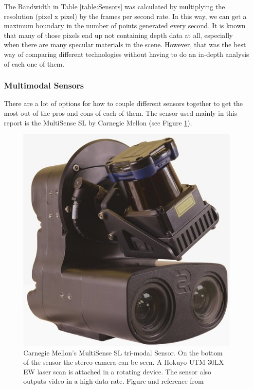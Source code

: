 \documentclass[11pt]{article}
\begin{document}
The Bandwidth in Table \ref{table:Sensors} was calculated by multiplying the resolution (pixel x pixel) by the frames per second rate. In this way, we can get a maximum boundary in the number of points generated every second. It is known that many of those pixels end up not containing depth data at all, especially when there are many specular materials in the scene. However, that was the best way of comparing different technologies without having to do an in-depth analysis of each one of them.

	\subsubsection{Multimodal Sensors}
	
There are a lot of options for how to couple different sensors together to get the most out of the pros and cons of each of them. The sensor used mainly in this report is the MultiSense SL by Carnegie Mellon \cite{multisense} (see Figure \ref{fig:MultiSenseSLSensor}).

\begin{figure}
	\begin{minipage}{0.45\textwidth}
		\centering
		\includegraphics[width=\textwidth]{MultiSenseSL}
	\end{minipage} \hfill
	\begin{minipage}{0.55\textwidth}
		\centering
		\caption{Carnegie Mellon's MultiSense SL tri-modal Sensor. On the bottom of the sensor the stereo camera can be seen. A Hokuyo UTM-30LX-EW laser scan is attached in a rotating device. The sensor also outputs video in a high-data-rate. Figure and reference from \cite{MultiSenseSLSensor}}
		\label{fig:MultiSenseSLSensor}
	\end{minipage}				
\end{figure}
\end{document}
